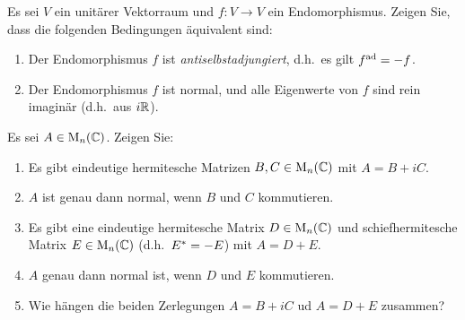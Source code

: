 \documentclass[a4paper, 10pt]{scrartcl}
\begin{document}
\begin{question}[subtitle = Charakterisierung antiselbstadjungierter Endomorphismen]
  Es sei $V$ ein unitärer Vektorraum und $f \colon V \to V$ ein Endomorphismus.
  Zeigen Sie, dass die folgenden Bedingungen äquivalent sind:
  \begin{enumerate}
    \item
      Der Endomorphismus $f$ ist \emph{antiselbstadjungiert}, d.h.\ es gilt $f^{\operatorname{ad}} = -f$.
    \item
      Der Endomorphismus $f$ ist normal, und alle Eigenwerte von $f$ sind rein imaginär (d.h.\ aus $i \mathbb{R}$).
  \end{enumerate}
\end{question}















\begin{question}[subtitle = Zerlegung von Matrizen]
  Es sei $A \in \operatorname{M}_{n}(\mathbb{C})$.
  Zeigen Sie:
  \begin{enumerate}
    \item
      Es gibt eindeutige hermitesche Matrizen $B, C \in \operatorname{M}_{n}(\mathbb{C})$ mit $A = B + i C$.
    \item
      $A$ ist genau dann normal, wenn $B$ und $C$ kommutieren.
    \item
      Es gibt eine eindeutige hermitesche Matrix $D \in \operatorname{M}_{n}(\mathbb{C})$ und schiefhermitesche Matrix $E \in \operatorname{M}_{n}(\mathbb{C})$ (d.h.\ $E^* = -E$) mit $A = D + E$.
    \item
      $A$ genau dann normal ist, wenn $D$ und $E$ kommutieren.
    \item
      Wie hängen die beiden Zerlegungen $A = B + iC$ ud $A = D + E$ zusammen?
  \end{enumerate}
\end{question}
\end{document}
